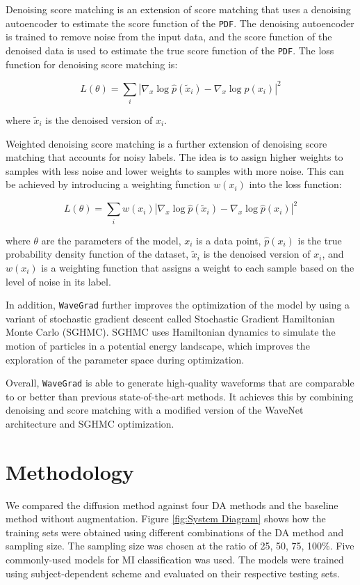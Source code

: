 \documentclass[12pt]{iopart}
\begin{document}
Denoising score matching is an extension of score matching that uses a denoising autoencoder to estimate the score function of the \texttt{PDF}. The denoising autoencoder is trained to remove noise from the input data, and the score function of the denoised data is used to estimate the true score function of the \texttt{PDF}. The loss function for denoising score matching is:

\begin{equation}
L(\theta) = \sum_i |\nabla_x \log \hat{p}(\tilde{x}_i) - \nabla_x \log \hat{p}(x_i)|^2
\end{equation}

where $\tilde{x}_i$ is the denoised version of $x_i$.

Weighted denoising score matching is a further extension of denoising score matching that accounts for noisy labels. The idea is to assign higher weights to samples with less noise and lower weights to samples with more noise. This can be achieved by introducing a weighting function $w(x_i)$ into the loss function:

\begin{equation}
L(\theta) = \sum_i w(x_i) |\nabla_x \log \hat{p}(\tilde{x}_i) - \nabla_x \log \hat{p}(x_i)|^2
\end{equation}

where $\theta$ are the parameters of the model, $x_i$ is a data point, $\hat{p}(x_i)$ is the true probability density function of the dataset, $\tilde{x}_i$ is the denoised version of $x_i$, and $w(x_i)$ is a weighting function that assigns a weight to each sample based on the level of noise in its label.

In addition, \texttt{WaveGrad} further improves the optimization of the model by using a variant of stochastic gradient descent called Stochastic Gradient Hamiltonian Monte Carlo (SGHMC). SGHMC uses Hamiltonian dynamics to simulate the motion of particles in a potential energy landscape, which improves the exploration of the parameter space during optimization.

Overall, \texttt{WaveGrad} is able to generate high-quality waveforms that are comparable to or better than previous state-of-the-art methods. It achieves this by combining denoising and score matching with a modified version of the WaveNet architecture and SGHMC optimization. 


\section{Methodology}
We compared the diffusion method against four DA methods and the baseline method without augmentation. Figure \ref{fig:System Diagram} shows how the training sets were obtained using different combinations of the DA method and sampling size.  The sampling size was chosen at the ratio of 25, 50, 75, 100\%.  Five commonly-used models for MI classification was used. The models were trained using subject-dependent scheme and evaluated on their respective testing sets. 
\end{document}
